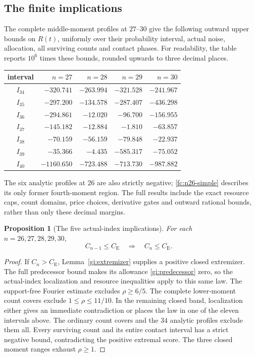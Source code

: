 \documentclass[aop,preprint]{imsart}
\newtheorem{proposition}[theorem]{Proposition}
\theoremstyle{definition}
\newcommand{\CE}{C_{\mathrm E}}
\numberwithin{equation}{section}
\begin{document}
\subsection{The finite implications}


The complete middle-moment profiles at $27$--$30$ give the following outward
upper bounds on $R(t)$, uniformly over their probability interval,
actual noise, allocation, all surviving counts and contact phases.
For readability, the table reports $10^6$ times these bounds,
rounded upwards to three decimal places.
\begin{center}
\begin{tabular}{crrrr}
\toprule
interval & $n=27$ & $n=28$ & $n=29$ & $n=30$\\
\midrule
$I_{34}$ & $-320.741$ & $-263.994$ & $-321.528$ & $-241.967$\\
$I_{35}$ & $-297.200$ & $-134.578$ & $-287.407$ & $-436.298$\\
$I_{36}$ & $-294.861$ & $-12.020$  & $-96.700$  & $-156.955$\\
$I_{37}$ & $-145.182$ & $-12.884$  & $-1.810$   & $-63.857$\\
$I_{38}$ & $-70.159$  & $-56.159$  & $-79.848$  & $-22.937$\\
$I_{39}$ & $-35.366$  & $-4.435$   & $-585.317$ & $-75.052$\\
$I_{40}$ & $-1160.650$& $-723.488$ & $-713.730$ & $-987.882$\\
\bottomrule
\end{tabular}
\end{center}
The six analytic profiles at $26$ are also strictly negative;
\eqref{fc:n26-simple} describes its only former fourth-moment
region. The full results include the exact resource caps, count
domains, price choices, derivative gates and outward rational
bounds, rather than only these decimal margins.

\begin{proposition}[The five actual-index implications]\label{fc:five}
For each $n=26,27,28,29,30$,
\[
 C_{n-1}\le\CE\quad\Longrightarrow\quad C_n\le\CE.
\]
\end{proposition}
\begin{proof}
If $C_n>\CE$, Lemma~\ref{gi:extremizer} supplies a positive
closed extremizer. The full predecessor bound makes its
allowance \eqref{gi:predecessor} zero, so the actual-index
localization and resource inequalities apply to this same law.
The support-free Fourier estimate excludes $\rho\ge6/5$.
The complete lower-moment count covers exclude
$1\le\rho\le11/10$.
In the remaining closed band, localization either gives an
immediate contradiction or places the law in one of the eleven
intervals above. The ordinary count covers and the $34$ analytic
profiles exclude them all. Every surviving count and its entire
contact interval has a strict negative bound, contradicting the
positive extremal score. The three closed moment ranges exhaust
$\rho\ge1$.
\end{proof}
\end{document}
